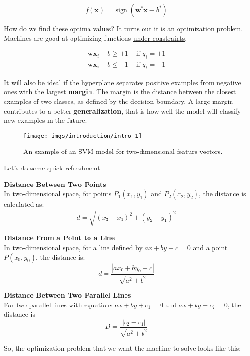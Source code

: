 \begin{equation*}
	f(\mathbf{x})=\operatorname{sign}\left(\mathbf{w}^* \mathbf{x}-b^*\right)
\end{equation*}


How do we find these optima values? It turns out it is an optimization problem. Machines are good at optimizing functions \underline{under constraints}.

$$
	\begin{array}{ll}
		\mathbf{w} \mathbf{x}_{i}-b \geq+1 & \text { if } y_{i}=+1 \\
		\mathbf{w} \mathbf{x}_{i}-b \leq-1 & \text { if } y_{i}=-1
	\end{array}
$$

It will also be ideal if the hyperplane separates positive examples from negative ones with the largest \textbf{margin}. The margin is the distance between the closest examples of two classes, as defined by the decision boundary. A large margin contributes to a better \textbf{generalization}, that is how well the model will classify new examples in the future.

\begin{figure}[H]
	\centering
	\texttt{[image: imgs/introduction/intro\_1]}
	\caption{An example of an SVM model for two-dimensional feature vectors.}
	\label{fig:intro1}
\end{figure}

Let's do some quick refreshment
\vspace*{1em}
\begin{tcolorbox}[enhanced jigsaw, breakable, pad at break*=1mm, colback=gray!20!white, colframe=black!85!black, title=\textbf{Distance Formulas in Euclidean Space}]
	\textbf{Distance Between Two Points} \\
	In two-dimensional space, for points \( P_1(x_1, y_1) \) and \( P_2(x_2, y_2) \), the distance is calculated as:
	\[ d = \sqrt{(x_2 - x_1)^2 + (y_2 - y_1)^2} \]

	\textbf{Distance From a Point to a Line} \\
	In two-dimensional space, for a line defined by \( ax + by + c = 0 \) and a point \( P(x_0, y_0) \), the distance is:
	\[ d = \frac{|ax_0 + by_0 + c|}{\sqrt{a^2 + b^2}} \]

	\textbf{Distance Between Two Parallel Lines} \\
	For two parallel lines with equations \( ax + by + c_1 = 0 \) and \( ax + by + c_2 = 0 \), the distance is:
	\[ D = \frac{|c_2 - c_1|}{\sqrt{a^2 + b^2}} \]
\end{tcolorbox}
\vspace*{1em}
So, the optimization problem that we want the machine to solve looks like this:

